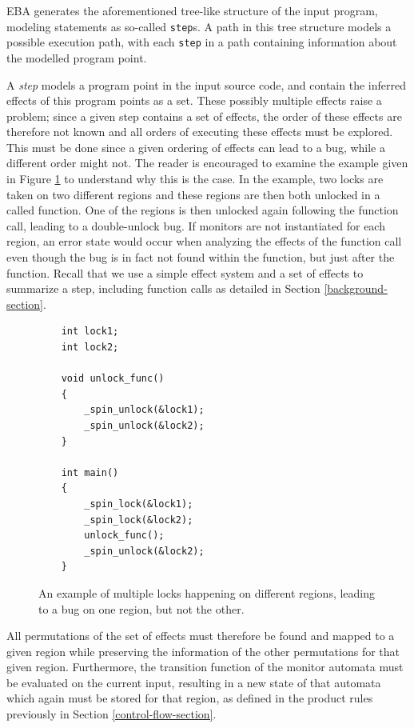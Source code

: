 \newpar EBA generates the aforementioned tree-like structure of the input program, modeling statements as so-called \texttt{step}s. A path in this tree structure models a possible execution path, with each \texttt{step} in a path containing information about the modelled program point. 

\newpar A \textit{step} models a program point in the input source code, and contain the inferred effects of this program points as a set. These possibly multiple effects raise a problem; since a given step contains a set of effects, the order of these effects are therefore not known and all orders of executing these effects must be explored. This must be done since a given ordering of effects can lead to a bug, while a different order might not. The reader is encouraged to examine the example given in Figure \ref{multiple-region-example} to understand why this is the case. In the example, two locks are taken on two different regions and these regions are then both unlocked in a called function. One of the regions is then unlocked again following the function call, leading to a double-unlock bug. If monitors are not instantiated for each region, an error state would occur when analyzing the effects of the function call even though the bug is in fact not found within the function, but just after the function. Recall that we use a simple effect system and a set of effects to summarize a step, including function calls as detailed in Section \ref{background-section}.

\begin{figure}[H]
    \centering
    \begin{verbatim}
    int lock1;
    int lock2;

    void unlock_func()
    {
        _spin_unlock(&lock1);
        _spin_unlock(&lock2);
    }

    int main()
    {
        _spin_lock(&lock1);
        _spin_lock(&lock2);
        unlock_func();
        _spin_unlock(&lock2);
    }
    \end{verbatim}
    \caption{An example of multiple locks happening on different regions, leading to a bug on one region, but not the other.}
    \label{multiple-region-example}
\end{figure}

\noindent All permutations of the set of effects must therefore be found and mapped to a given region while preserving the information of the other permutations for that given region. Furthermore, the transition function of the monitor automata must be evaluated on the current input, resulting in a new state of that automata which again must be stored for that region, as defined in the product rules previously in Section \ref{control-flow-section}.

